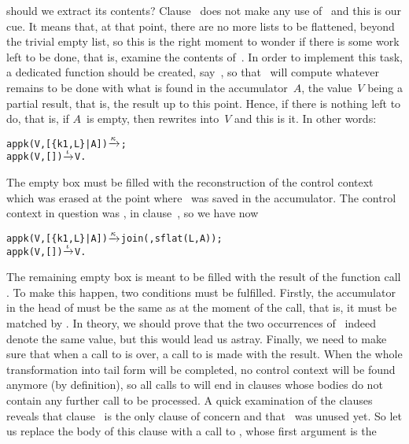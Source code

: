 should we extract its contents? Clause~\clause{\gamma} does not make
any use of~ and this is our cue. It means that, at that
point, there are no more lists to be flattened, beyond the trivial
empty list, so this is the right moment to wonder if there is some
work left to be done, that is, examine the contents of~. In
order to implement this task, a dedicated function should be created,
say~, so that~ will compute
whatever remains to be done with what is found in the
accumulator~\(A\), the value~\(V\) being a partial result, that is,
the result up to this point. Hence, if there is nothing left to do,
that is, if \(A\)~is empty, then  rewrites
into~\(V\) and this is it. In other words:
\begin{alltt}
appk(V,[\{k1,L\}|A]) \(\smashedrightarrow{\kappa}\) ;
appk(V,        []) \(\smashedrightarrow{\iota}\) V.\hfill% \emph{The end}
\end{alltt}
The empty box must be filled with the reconstruction of the control
context which was erased at the point where~ was saved in
the accumulator. The control context in question was
, in
clause~\clause{\epsilon}, so we have now
\begin{alltt}
appk(V,[\{k1,L\}|A]) \(\smashedrightarrow{\kappa}\) join(,sflat(L,A));
appk(V,        []) \(\smashedrightarrow{\iota}\) V.
\end{alltt}
The remaining empty box is meant to be filled with the result of the
function call . To make this
happen, two conditions must be fulfilled. Firstly, the accumulator in
the head of  must be the same as at the moment of the
call, that is, it must be matched by \erlcode{[\{k1,L\}|A]}. In
theory, we should prove that the two occurrences of~ indeed
denote the same value, but this would lead us astray. Finally, we need
to make sure that when a call to  is over, a call
to  is made with the result. When the whole
transformation into tail form will be completed, no control context
will be found anymore (by definition), so all calls
to  will end in clauses whose bodies do not contain
any further call to be processed. A quick examination of the clauses
reveals that clause~\clause{\gamma} is the only clause of concern and
that ~was unused yet. So let us replace the body of this
clause with a call to , whose first argument is the
